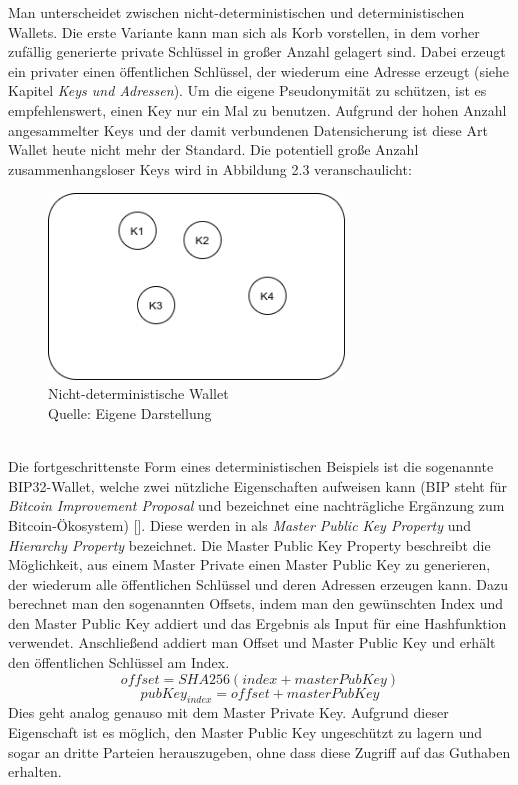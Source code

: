 Man unterscheidet zwischen nicht-deterministischen und deterministischen Wallets. Die erste Variante kann man sich als Korb vorstellen, in dem vorher zufällig generierte private Schlüssel in großer Anzahl gelagert sind. Dabei erzeugt ein privater einen öffentlichen Schlüssel, der wiederum eine Adresse erzeugt (siehe Kapitel \emph{Keys und Adressen}).
Um die eigene Pseudonymität zu schützen, ist es empfehlenswert, einen Key nur ein Mal zu benutzen. Aufgrund der hohen Anzahl angesammelter Keys und der damit verbundenen Datensicherung ist diese Art Wallet heute nicht mehr der Standard. Die potentiell große Anzahl zusammenhangsloser Keys wird in Abbildung 2.3 veranschaulicht:
\begin{figure}[htpb]
	\centering
	\includegraphics[width=0.7\textwidth]{images/non_det_wallet.png}
	\caption{Nicht-deterministische Wallet\\
	Quelle: Eigene Darstellung}
	\label{6braun:fig:non-deterministic_wallet}
\end{figure}\\
Die fortgeschrittenste Form eines deterministischen Beispiels ist die sogenannte BIP32-Wallet, welche zwei nützliche Eigenschaften aufweisen kann (BIP steht für \emph{Bitcoin Improvement Proposal} und bezeichnet eine nachträgliche Ergänzung zum Bitcoin-Ökosystem) [\cite{antanopoulos_2014}].
Diese werden in \cite{buterin_2013} als \emph{Master Public Key Property} und \emph{Hierarchy Property} bezeichnet.
Die Master Public Key Property beschreibt die Möglichkeit, aus einem Master Private einen Master Public Key zu generieren, der wiederum alle öffentlichen Schlüssel und deren Adressen erzeugen kann. Dazu berechnet man den sogenannten Offsets, indem man den gewünschten Index und den Master Public Key addiert und das Ergebnis als Input für eine Hashfunktion verwendet. Anschließend addiert man Offset und Master Public Key und erhält den öffentlichen Schlüssel am Index.
$$offset = SHA256(index + masterPubKey)$$
$$pubKey_{index} = offset + masterPubKey$$ Dies geht analog genauso mit dem Master Private Key. 
Aufgrund dieser Eigenschaft ist es möglich, den Master Public Key ungeschützt zu lagern und sogar an dritte Parteien herauszugeben, ohne dass diese Zugriff auf das Guthaben erhalten.\\

